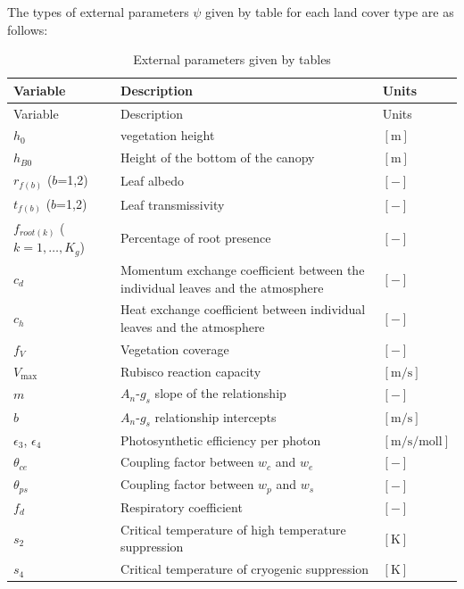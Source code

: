 The types of external parameters \(\psi\) given by table for each land cover type are as follows:

\begin{landscape}

\begin{longtable}[]{@{}lll@{}}
\caption{External parameters given by tables}\tabularnewline
\toprule
Variable & Description & Units \\
\midrule
\endfirsthead
\toprule
Variable & Description & Units \\
\midrule
\endhead
\(h_0\) & vegetation height & \(\mathrm{[m]}\) \\
\(h_{B0}\) & Height of the bottom of the canopy & \(\mathrm{[m]}\) \\
\(r_{f(b)}\) (\(b\)=1,2) & Leaf albedo & \(\mathrm{[-]}\) \\
\(t_{f(b)}\) (\(b\)=1,2) & Leaf transmissivity & \(\mathrm{[-]}\) \\
\(f_{root(k)}\) (\(k=1,\ldots,K_g\)) & Percentage of root presence & \(\mathrm{[-]}\) \\
\(c_d\) & Momentum exchange coefficient between the individual leaves and the atmosphere & \(\mathrm{[-]}\) \\
\(c_h\) & Heat exchange coefficient between individual leaves and the atmosphere & \(\mathrm{[-]}\) \\
\(f_V\) & Vegetation coverage & \(\mathrm{[-]}\) \\
\(V_{\max}\) & Rubisco reaction capacity & \(\mathrm{[m/s]}\) \\
\(m\) & \(A_n\)-\(g_s\) slope of the relationship & \(\mathrm{[-]}\) \\
\(b\) & \(A_n\)-\(g_s\) relationship intercepts & \(\mathrm{[m/s]}\) \\
\(\epsilon_3\), \(\epsilon_4\) & Photosynthetic efficiency per photon & \(\mathrm{[m/s/moll]}\) \\
\(\theta_{ce}\) & Coupling factor between \(w_c\) and \(w_e\) & \(\mathrm{[-]}\) \\
\(\theta_{ps}\) & Coupling factor between \(w_p\) and \(w_s\) & \(\mathrm{[-]}\) \\
\(f_d\) & Respiratory coefficient & \(\mathrm{[-]}\) \\
\(s_2\) & Critical temperature of high temperature suppression & \(\mathrm{[K]}\) \\
\(s_4\) & Critical temperature of cryogenic suppression & \(\mathrm{[K]}\) \\
\bottomrule
\end{longtable}

\end{landscape}

